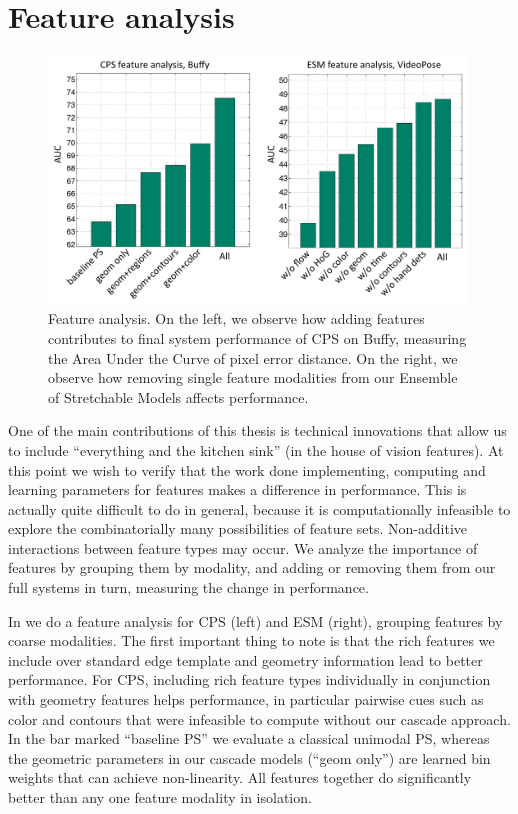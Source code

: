 \section{Feature analysis}
\begin{figure}[tb]
\begin{center}
\includegraphics[width=0.99\textwidth]{figs/ablative-bars}
\caption[Feature analysis.]{Feature analysis.  On the left, we observe how 
adding features contributes to final system performance of CPS on Buffy, 
measuring the Area Under the Curve of pixel error distance.  On the right, we 
observe how removing single feature modalities from our Ensemble of Stretchable 
Models affects performance.}
\label{fig:ablative}
\end{center}
\end{figure}

One of the main contributions of this thesis is technical innovations that 
allow us to include ``everything and the kitchen sink'' (in the house of vision 
features).  At this point we wish to verify that the work done implementing, 
computing and learning parameters for features makes a difference in 
performance.  This is actually quite difficult to do in general, because it is 
computationally infeasible to explore the combinatorially many possibilities of 
feature sets. Non-additive interactions between feature types may occur. We 
analyze the importance of features by grouping them by modality, and adding 
or removing them from our full systems in turn, measuring the change in 
performance.

In  we do a feature analysis for CPS (left) and ESM (right), 
grouping features by coarse modalities.  The first important thing to note is 
that the rich features we include over standard edge template and geometry 
information lead to better performance.  For CPS, including rich feature types 
individually in conjunction with geometry features helps performance, in 
particular pairwise cues such as color and contours that were infeasible to 
compute without our cascade approach.  In the bar marked ``baseline PS'' we 
evaluate a classical unimodal PS, whereas the geometric parameters in our 
cascade models (``geom only'') are learned bin weights that can achieve 
non-linearity.  All features together do significantly better than any one 
feature modality in isolation.

